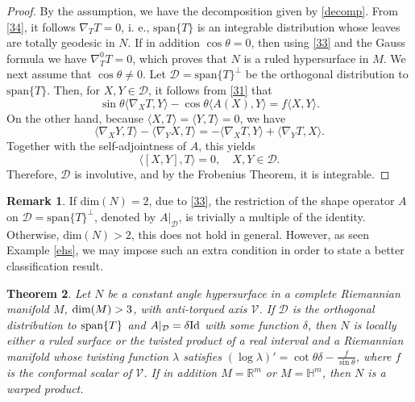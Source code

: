 \documentclass[12pt]{amsart}
\def\r{\mathbb R}
\def\h{\mathbb H}
\def\v{\mathcal V}
\newtheorem{theorem}{Theorem}[section]
\theoremstyle{definition}
\newtheorem{remark}[theorem]{Remark}
\begin{document}
\begin{proof}
By the assumption, we have the decomposition given by \eqref{decomp}. From \eqref{34}, it follows $\nabla_TT=0$, i. e., $\mbox{span}\{T\}$ is an integrable distribution whose leaves are totally geodesic in $N$. If in addition $\cos\theta=0$, then using \eqref{33} and the Gauss formula we have $\nabla^0_TT=0$, which proves that $N$ is a ruled hypersurface in $M$. We next assume that $\cos\theta \neq 0$. Let $\mathcal{D}=\mbox{span}\{T\}^{\perp}$ be the orthogonal distribution to $\mbox{span}\{T\}$. Then, for $X,Y \in \mathcal{D}$, it follows from \eqref{31} that 
$$
 \sin \theta \langle \nabla_X T,Y \rangle -\cos \theta \langle A(X),Y\rangle =f\langle X,Y \rangle.
$$
On the other hand, because $\langle X  ,T\rangle=\langle Y  ,T\rangle=0$, we have
$$
\langle \nabla_X Y ,T\rangle-\langle \nabla_Y X ,T\rangle=-\langle \nabla_X T ,Y\rangle+\langle \nabla_Y T ,X\rangle.
$$
Together with the self-adjointness of $A$, this yields
$$
\langle [X, Y] ,T\rangle=0, \quad X,Y \in \mathcal{D}.
$$
Therefore, $\mathcal{D}$ is involutive, and by the Frobenius Theorem, it is integrable. 
\end{proof}

\begin{remark}
If $\mbox{dim}(N)=2$, due to \eqref{33}, the restriction of the shape operator $A$ on $\mathcal{D}=\mbox{span}\{T\}^{\perp}$, denoted by $A|_{\mathcal{D}}$, is trivially a multiple of the identity. Otherwise, $\mbox{dim}(N)>2$, this does not hold in general. However, as seen Example \ref{ehs}, we may impose such an extra condition in order to state a better classification result. 
\end{remark}

\begin{theorem}\label{ths1}
Let $N$ be a constant angle hypersurface in a complete Riemannian manifold $M$, $\textnormal{dim}(M)>3$, with anti-torqued axis $\v$. If $\mathcal{D}$ is the orthogonal distribution to $\textnormal{span}\{T\}$ and $A|_{\mathcal{D}}=\delta \textnormal{Id}$ with some function $\delta$, then $N$ is locally either a ruled surface or the twisted product of a real interval and a Riemannian manifold whose twisting function $\lambda$ satisfies $(\log \lambda)'=\cot\theta\delta-\frac{f}{\sin\theta}$, where $f$ is the conformal scalar of $\v$. If in addition $M=\r^m$ or $M=\h^m$, then $N$ is a warped product.
\end{theorem}
\end{document}
